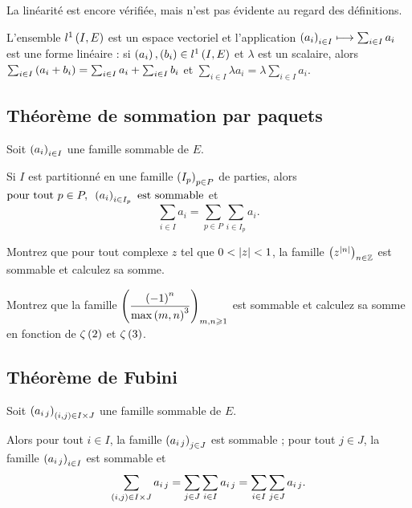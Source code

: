 La linéarité est encore vérifiée, mais n'est pas évidente au regard des définitions.

\begin{prop}
L'ensemble \(l^1\left(I,E\right)\) est un espace vectoriel et l'application \(\left(a_i\right)_{i\in I}\longmapsto\sum_{i\in I}a_i\) est une forme linéaire : si \(\left(a_i\right),\left(b_i\right)\in l^1\left(I,E\right)\) et \(\lambda\) est un scalaire, alors \(\sum_{i\in I}\left(a_i+b_i\right)=\sum_{i\in I}a_i+\sum_{i\in I}b_i\) et \(\sum_{i\in I}\lambda a_i=\lambda\sum_{i\in I}a_i\).
\end{prop}

\subsection{Théorème de sommation par paquets}

\begin{theo}
Soit \(\left(a_i\right)_{i\in I}\) une famille sommable de \(E\).

Si \(I\) est partitionné en une famille \(\left(I_p\right)_{p\in P}\) de parties, alors \(\quantifs{\tpt p\in P}\paren{a_i}_{i\in I_p}\text{ est sommable}\) et \[\sum_{i\in I}a_i=\sum_{p\in P}\sum_{i\in I_p}a_i.\]
\end{theo}

\begin{exo}
Montrez que pour tout complexe \(z\) tel que \(0<\left\lvert z\right\rvert<1\), la famille \(\left(z^{\left\lvert n\right\rvert}\right)_{n\in\mathbb{Z}}\) est sommable et calculez sa somme.
\end{exo}

\begin{exo}
Montrez que la famille \(\left(\dfrac{\left(-1\right)^n}{\max\left(m,n\right)^3}\right)_{m,n\geqslant1}\) est sommable et calculez sa somme en fonction de \(\zeta\left(2\right)\) et \(\zeta\left(3\right)\).
\end{exo}

\subsection{Théorème de Fubini}

\begin{theo}
Soit \(\left(a_{i\,j}\right)_{\left(i,j\right)\in I\times J}\) une famille sommable de \(E\).

Alors pour tout \(i\in I\), la famille \(\left(a_{i\,j}\right)_{j\in J}\) est sommable ; pour tout \(j\in J\), la famille \(\left(a_{i\,j}\right)_{i\in I}\) est sommable et \[\sum_{\left(i,j\right)\in I\times J}a_{i\,j}=\sum_{j\in J}\sum_{i\in I}a_{i\,j}=\sum_{i\in I}\sum_{j\in J}a_{i\,j}.\]
\end{theo}

